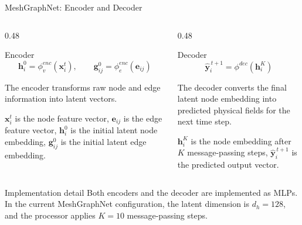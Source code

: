 \documentclass[aspectratio=169,10pt]{beamer}
\begin{document}
\begin{frame}{MeshGraphNet: Encoder and Decoder}
\scriptsize

\begin{columns}[T,onlytextwidth]

\begin{column}{0.48\textwidth}
\begin{block}{Encoder}
\[
  \mathbf{h}_i^0 = \phi_v^{enc}(\mathbf{x}_i^t),
  \qquad
  \mathbf{g}_{ij}^0 = \phi_e^{enc}(\mathbf{e}_{ij})
\]

The encoder transforms raw node and edge information into latent vectors.

\vspace{1mm}

\(\mathbf{x}_i^t\) is the node feature vector,  
\(\mathbf{e}_{ij}\) is the edge feature vector,  
\(\mathbf{h}_i^0\) is the initial latent node embedding,  
\(\mathbf{g}_{ij}^0\) is the initial latent edge embedding.
\end{block}
\end{column}

\begin{column}{0.48\textwidth}
\begin{block}{Decoder}
\[
  \hat{\mathbf{y}}_i^{\,t+1}
  =
  \phi^{dec}(\mathbf{h}_i^K)
\]

The decoder converts the final latent node embedding into predicted physical
fields for the next time step.

\vspace{1mm}

\(\mathbf{h}_i^K\) is the node embedding after \(K\) message-passing steps,  
\(\hat{\mathbf{y}}_i^{\,t+1}\) is the predicted output vector.
\end{block}
\end{column}

\end{columns}

\vspace{2mm}

\begin{block}{Implementation detail}
Both encoders and the decoder are implemented as MLPs. In the current
MeshGraphNet configuration, the latent dimension is \(d_h=128\), and the
processor applies \(K=10\) message-passing steps.
\end{block}

\end{frame}
\end{document}
